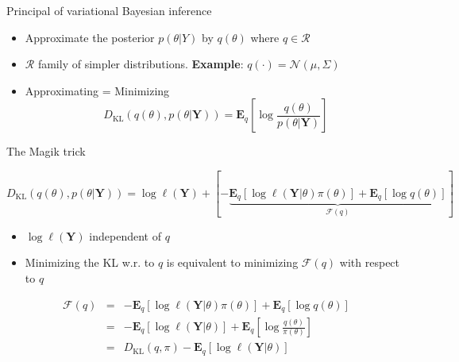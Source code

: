 \documentclass[compress,10pt]{beamer}
\begin{document}
\begin{frame}{Principal of variational Bayesian inference}
\protect\hypertarget{variational-bayesian-inference}{}
\begin{itemize}
\item
  Approximate the posterior \(p(\theta | Y)\) by \(q(\theta)\) where
  \(q\in \mathcal{R}\)
\item
  \(\mathcal{R}\) family of simpler distributions. \textbf{Example}:
  \(q(\cdot) = \mathcal{N}(\mu,\Sigma)\)
\item
  Approximating = Minimizing
  \[ D_\text{KL}(q(\theta),p(\theta | \mathbf{Y})) = \mathbf{E}_q\left[\log \frac{q(\theta)}{p(\theta | \mathbf{Y})}\right]\]
\end{itemize}
\end{frame}
\begin{frame}{The Magik trick}



$$D_\text{KL}(q(\theta),p(\theta | \mathbf{Y}))  = \log \ell(\mathbf{Y}) + \left[ - \underbrace{\mathbf{E}_q[\log \ell(\mathbf{Y}|\theta)\pi(\theta)] +\mathbf{E}_q[\log q(\theta)]}_{\mathcal{F}(q)}\right]$$ 

\begin{itemize}
 \item \(\log \ell(\mathbf{Y})\) independent of \(q\)
\item   Minimizing the KL  w.r. to $q$ is
equivalent to minimizing $\mathcal{F}(q)$ with respect to $q$

\end{itemize}


\begin{eqnarray}
\mathcal{F}(q) &=& -  \mathbf{E}_q[\log \ell(\mathbf{Y}|\theta)\pi(\theta)] + \mathbf{E}_q[\log q(\theta)] \\
&=&  -  \mathbf{E}_q[\log \ell(\mathbf{Y}|\theta)] + \mathbf{E}_q\left[\log \frac{q(\theta)}{\pi(\theta)}\right] \\
&=&D_{\text{KL}}(q,\pi) -  \mathbf{E}_q[\log \ell(\mathbf{Y}|\theta)]   
\end{eqnarray}

\end{frame}
\end{document}
